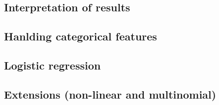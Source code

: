 

\subsection{Interpretation of results}
\subsection{Hanlding categorical features}
\subsection{Logistic regression}
\subsection{Extensions (non-linear and multinomial)}

